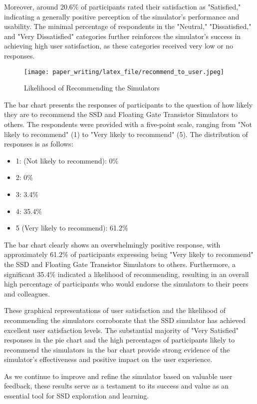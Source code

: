 \documentclass[conference]{paper_writing/latex_file/IEEEtran}
\begin{document}
Moreover, around 20.6\% of participants rated their satisfaction as "Satisfied," indicating a generally positive perception of the simulator's performance and usability. The minimal percentage of respondents in the "Neutral," "Dissatisfied," and "Very Dissatisfied" categories further reinforces the simulator's success in achieving high user satisfaction, as these categories received very low or no responses.
\begin{figure}[h]
    \centering
    \texttt{[image: paper\_writing/latex\_file/recommend\_to\_user.jpeg]}
    \caption{Likelihood of Recommending the Simulators}
    \label{fig:enter-label}
\end{figure}
The bar chart presents the responses of participants to the question of how likely they are to recommend the SSD and Floating Gate Transistor Simulators to others. The respondents were provided with a five-point scale, ranging from "Not likely to recommend" (1) to "Very likely to recommend" (5). The distribution of responses is as follows:
\begin{itemize}
    \item 1: (Not likely to recommend): 0\%
    \item 2: 0\%
    \item 3: 3.4\%
    \item 4: 35.4\%
    \item 5 (Very likely to recommend): 61.2\%
\end{itemize}
The bar chart clearly shows an overwhelmingly positive response, with approximately 61.2\% of participants expressing being "Very likely to recommend" the SSD and Floating Gate Transistor Simulators to others. Furthermore, a significant 35.4\% indicated a likelihood of recommending, resulting in an overall high percentage of participants who would endorse the simulators to their peers and colleagues.

These graphical representations of user satisfaction and the likelihood of recommending the simulators corroborate that the SSD simulator has achieved excellent user satisfaction levels. The substantial majority of "Very Satisfied" responses in the pie chart and the high percentages of participants likely to recommend the simulators in the bar chart provide strong evidence of the simulator's effectiveness and positive impact on the user experience.

As we continue to improve and refine the simulator based on valuable user feedback, these results serve as a testament to its success and value as an essential tool for SSD exploration and learning.
\end{document}
